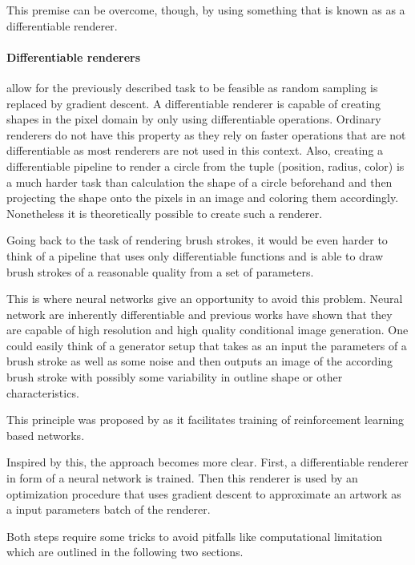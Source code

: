 This premise can be overcome, though, by using something that is known as as a differentiable
renderer.
\paragraph{Differentiable renderers} allow for the previously described task to be
feasible as random sampling is replaced by gradient descent.
A differentiable renderer is capable of creating shapes in the pixel domain by only
using differentiable operations.
Ordinary renderers do not have this property as they rely on faster operations that are
not differentiable as most renderers are not used in this context.
Also, creating a differentiable pipeline to render a circle from the tuple (position,
 radius, color) is a much harder task than calculation the shape of a circle beforehand
and then projecting the shape onto the pixels in an image and coloring them accordingly.
Nonetheless it is theoretically possible to create such a renderer.

Going back to the task of rendering brush strokes, it would be even harder to think
of a pipeline that uses only differentiable functions and is able to draw brush strokes
of a reasonable quality from a set of parameters.

This is where neural networks give an opportunity to avoid this problem.
Neural network are inherently differentiable and previous works have shown that
they are capable of high resolution and high quality conditional image generation.
One could easily think of a generator setup that takes as an input the parameters of
a brush stroke as well as some noise and then outputs an image of the according
brush stroke with possibly some variability in outline shape or other characteristics.

This principle was proposed by \cite{japanese neural renderer} as it facilitates
training of reinforcement learning based networks.

Inspired by this, the approach becomes more clear.
First, a differentiable renderer in form of a neural network is trained.
Then this renderer is used by an optimization procedure that uses gradient descent
to approximate an artwork as a input parameters batch of the renderer.

Both steps require some tricks to avoid pitfalls like computational limitation which
are outlined in the following two sections.


